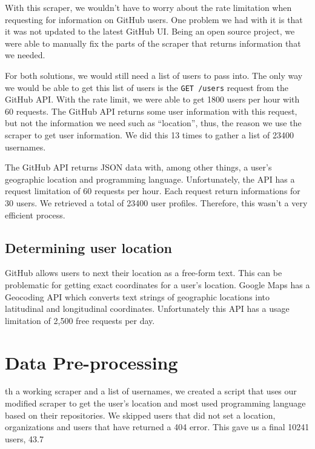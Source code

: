 \documentclass[11pt]{article}
\begin{document}
With this scraper, we wouldn’t have to worry about the rate limitation when requesting for information on GitHub users. One problem we had with it is that it was not updated to the latest GitHub UI. Being an open source project, we were able to manually fix the parts of the scraper that returns information that we needed.

For both solutions, we would still need a list of users to pass into. The only way we would be able to get this list of users is the \texttt{GET /users} request from the GitHub API. With the rate limit, we were able to get 1800 users per hour with 60 requests. The GitHub API returns some user information with this request, but not the information we need such as “location”, thus, the reason we use the scraper to get user information. We did this 13 times to gather a list of 23400 usernames.

The GitHub API returns JSON data with, among other things, a user’s geographic location and programming language. Unfortunately, the API has a request limitation of 60 requests per hour. Each request return informations for 30 users. We retrieved a total of 23400 user profiles. Therefore, this wasn’t a very efficient process.

      \subsection{Determining user location}
GitHub allows users to next their location as a free-form text. This can be problematic for getting exact coordinates for a user's location. Google Maps has a Geocoding API which converts text strings of geographic locations into latitudinal and longitudinal coordinates. Unfortunately this API has a usage limitation of 2,500 free requests per day.

\section{Data Pre-processing}

th a working scraper and a list of usernames, we created a script that uses our modified scraper to get the user’s location and most used programming language based on their repositories. We skipped users that did not set a location, organizations and users that have returned a 404 error. This gave us a final 10241 users, 43.7%
\end{document}
